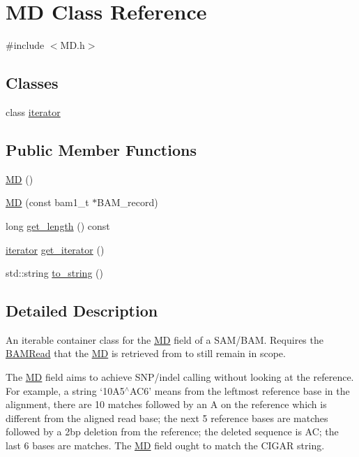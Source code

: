 \hypertarget{class_m_d}{
\section{MD Class Reference}
\label{class_m_d}
}


{\ttfamily \#include $<$MD.h$>$}

\subsection*{Classes}
\begin{DoxyCompactItemize}
\item 
class \hyperlink{class_m_d_1_1iterator}{iterator}
\end{DoxyCompactItemize}
\subsection*{Public Member Functions}
\begin{DoxyCompactItemize}
\item 
\hyperlink{class_m_d_aa7967579000eaef089f10895267a5504}{MD} ()
\item 
\hyperlink{class_m_d_a7b3eb9755ab164b552c5d74d5748a039}{MD} (const bam1\_\-t $\ast$BAM\_\-record)
\item 
long \hyperlink{class_m_d_ab644e59d5b25a7465a5c7c1fe8b817ac}{get\_\-length} () const 
\item 
\hyperlink{class_m_d_1_1iterator}{iterator} \hyperlink{class_m_d_ae4f7cc374b63a6685a49731385c4215d}{get\_\-iterator} ()
\item 
std::string \hyperlink{class_m_d_a917a401e11b15587fab8371f7723002c}{to\_\-string} ()
\end{DoxyCompactItemize}


\subsection{Detailed Description}
An iterable container class for the \hyperlink{class_m_d}{MD} field of a SAM/BAM. Requires the \hyperlink{class_b_a_m_read}{BAMRead} that the \hyperlink{class_m_d}{MD} is retrieved from to still remain in scope.

The \hyperlink{class_m_d}{MD} field aims to achieve SNP/indel calling without looking at the reference. For example, a string `10A5$^\wedge$AC6' means from the leftmost reference base in the alignment, there are 10 matches followed by an A on the reference which is different from the aligned read base; the next 5 reference bases are matches followed by a 2bp deletion from the reference; the deleted sequence is AC; the last 6 bases are matches. The \hyperlink{class_m_d}{MD} field ought to match the CIGAR string.

